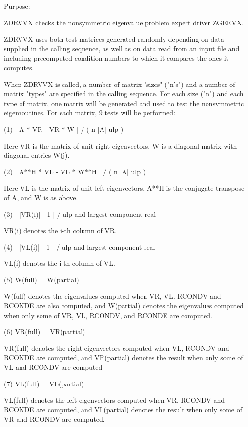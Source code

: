\begin{DoxyParagraph}{Purpose\+: }
\begin{DoxyVerb}    ZDRVVX  checks the nonsymmetric eigenvalue problem expert driver
    ZGEEVX.

    ZDRVVX uses both test matrices generated randomly depending on
    data supplied in the calling sequence, as well as on data
    read from an input file and including precomputed condition
    numbers to which it compares the ones it computes.

    When ZDRVVX is called, a number of matrix "sizes" ("n's") and a
    number of matrix "types" are specified in the calling sequence.
    For each size ("n") and each type of matrix, one matrix will be
    generated and used to test the nonsymmetric eigenroutines.  For
    each matrix, 9 tests will be performed:

    (1)     | A * VR - VR * W | / ( n |A| ulp )

      Here VR is the matrix of unit right eigenvectors.
      W is a diagonal matrix with diagonal entries W(j).

    (2)     | A**H  * VL - VL * W**H | / ( n |A| ulp )

      Here VL is the matrix of unit left eigenvectors, A**H is the
      conjugate transpose of A, and W is as above.

    (3)     | |VR(i)| - 1 | / ulp and largest component real

      VR(i) denotes the i-th column of VR.

    (4)     | |VL(i)| - 1 | / ulp and largest component real

      VL(i) denotes the i-th column of VL.

    (5)     W(full) = W(partial)

      W(full) denotes the eigenvalues computed when VR, VL, RCONDV
      and RCONDE are also computed, and W(partial) denotes the
      eigenvalues computed when only some of VR, VL, RCONDV, and
      RCONDE are computed.

    (6)     VR(full) = VR(partial)

      VR(full) denotes the right eigenvectors computed when VL, RCONDV
      and RCONDE are computed, and VR(partial) denotes the result
      when only some of VL and RCONDV are computed.

    (7)     VL(full) = VL(partial)

      VL(full) denotes the left eigenvectors computed when VR, RCONDV
      and RCONDE are computed, and VL(partial) denotes the result
      when only some of VR and RCONDV are computed.


\end{DoxyVerb}
\end{DoxyParagraph}

